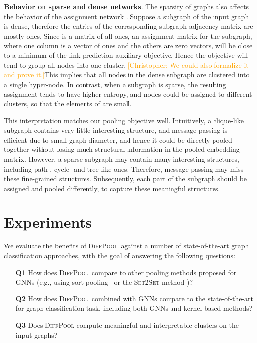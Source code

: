 \documentclass{article}
\newcommand{\chris}[1]{{{\textcolor{orange}{[Christopher: #1]}}}}
\newcommand{\xhdr}[1]{{\noindent\bfseries #1}.}
\newcommand{\name}{\textsc{DiffPool}\xspace}
\begin{document}
{\xhdr{Behavior on sparse and dense networks}
The sparsity of graphs also affects the behavior of the assignment network .
Suppose a subgraph of the input graph is dense, therefore the entries of the corresponding subgraph adjacency matrix are mostly ones. Since   is a matrix of all ones, an assignment matrix for the subgraph, where one column is a vector of ones and the others are zero vectors, will be close to a minimum of the link prediction auxiliary objective. Hence the objective will tend to group all nodes into one cluster. \chris{We could also formalize it and prove it.}This  implies that all nodes in the dense subgraph are clustered into a single hyper-node. In contrast, when a subgraph is sparse, the resulting assignment tends to have higher entropy, and nodes could be assigned to different clusters, so that the elements of  are small.

This interpretation matches our pooling objective well. Intuitively, a clique-like subgraph contains very little interesting structure, and message passing is efficient due to small graph diameter, and hence it could be directly pooled together without losing much structural information in the pooled embedding matrix. However, a sparse subgraph may contain many interesting structures, including path-, cycle- and tree-like ones. Therefore, message passing may miss these fine-grained structures. Subsequently, each part of the subgraph should be assigned and pooled differently, to capture these meaningful structures. 

}
 \section{Experiments}
\label{sec:ex}

We evaluate the benefits of \name\ against a number of state-of-the-art graph classification approaches, with the goal of answering the following questions:
\begin{enumerate}[leftmargin=20pt]
\item[{\bf Q1}] How does  \name\ compare to other pooling methods proposed for GNNs (e.g., using sort pooling~\cite{zhang2018end} or the \textsc{Set2Set} method \cite{Gil+2017})?
\item[{\bf Q2}] How does  \name\ combined with GNNs compare to the state-of-the-art for graph classification task, including both GNNs and kernel-based methods?
\item[{\bf Q3}] Does  \name  compute meaningful and interpretable clusters on the input graphs?
\end{enumerate}
\end{document}
